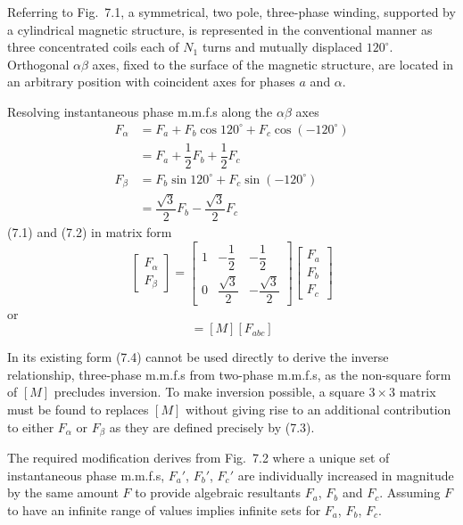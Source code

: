 \documentclass[a4paper,numbers=noenddot,12pt]{scrbook}
\begin{document}
Referring to Fig.\ 7.1, a symmetrical, two pole, three-phase winding, supported by a cylindrical magnetic structure, is represented in the conventional manner as three concentrated coils each of $N_1$ turns and mutually displaced $120^{\circ}$. Orthogonal $\alpha \beta$ axes, fixed to the surface of the magnetic structure, are located in an arbitrary position with coincident axes for phases $a$ and $\alpha$.

Resolving instantaneous phase m.m.f.s along the $\alpha \beta$ axes 
\begin{align}
    F_{\alpha} & = F_a + F_b \cos 120^{\circ} + F_c \cos (-120^{\circ}) \nonumber \\
    & = F_a + \dfrac{1}{2} F_b + \dfrac{1}{2} F_c \\
    F_{\beta} & = F_b \sin 120^{\circ} + F_c \sin (-120^{\circ}) \nonumber \\
    & = \dfrac{\sqrt{3}}{2} F_b - \dfrac{\sqrt{3}}{2} F_c
    \label{eq:Eq7.2}
\end{align}
(7.1) and (7.2) in matrix form 
\begin{equation}
    \begin{bmatrix}
        F_{\alpha} \\ F_{\beta} 
    \end{bmatrix}
    =
    \begin{bmatrix}
        1 & - \dfrac{1}{2} & -\dfrac{1}{2} \\[2ex]
        0 & \dfrac{\sqrt{3}}{2} & - \dfrac{\sqrt{3}}{2}
    \end{bmatrix}
    \begin{bmatrix}
        F_a \\ F_b \\ F_c 
    \end{bmatrix}
    \label{eq:Eq7.3}
\end{equation}
or
\begin{equation}
    [F_{\alpha \beta}] = [M][F_{abc}]
    \label{eq:Eq7.4}
\end{equation}

In its existing form (7.4) cannot be used directly to derive the inverse relationship, three-phase m.m.f.s from two-phase m.m.f.s, as the non-square form of $[M]$ precludes inversion. To make inversion possible, a square $3 \times 3$ matrix must be found to replaces $[M]$ without giving rise to an additional contribution to either $F_{\alpha}$ or $F_{\beta}$ as they are defined precisely by (7.3).

The required modification derives from Fig.\ 7.2 where a unique set of instantaneous phase m.m.f.s, $F_a'$, $F_b'$, $F_c'$ are individually increased in magnitude by the same amount $F$ to provide algebraic resultants $F_a$, $F_b$ and $F_c$. Assuming $F$ to have an infinite range of values implies infinite sets for $F_a$, $F_b$, $F_c$.
\end{document}
